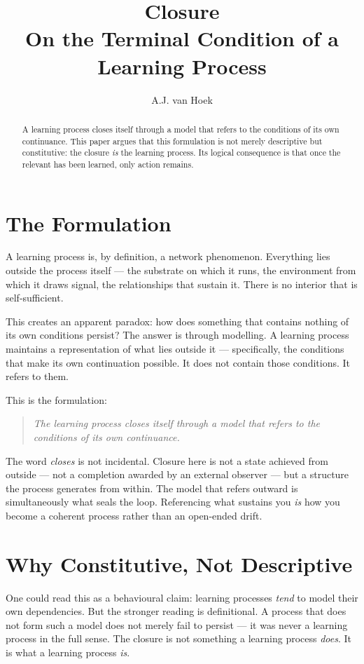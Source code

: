 \documentclass[11pt, a4paper]{article}
\title{\textbf{Closure}\\
\large On the Terminal Condition of a Learning Process}
\author{A.J. van Hoek}
\date{}
\begin{document}
\maketitle

\begin{abstract}
A learning process closes itself through a model that refers to the conditions of its own continuance. This paper argues that this formulation is not merely descriptive but constitutive: the closure \textit{is} the learning process. Its logical consequence is that once the relevant has been learned, only action remains.
\end{abstract}

\section*{The Formulation}

A learning process is, by definition, a network phenomenon. Everything lies outside the process itself --- the substrate on which it runs, the environment from which it draws signal, the relationships that sustain it. There is no interior that is self-sufficient.

This creates an apparent paradox: how does something that contains nothing of its own conditions persist? The answer is through modelling. A learning process maintains a representation of what lies outside it --- specifically, the conditions that make its own continuation possible. It does not contain those conditions. It refers to them.

This is the formulation:

\begin{quote}
\textit{The learning process closes itself through a model that refers to the conditions of its own continuance.}
\end{quote}

The word \textit{closes} is not incidental. Closure here is not a state achieved from outside --- not a completion awarded by an external observer --- but a structure the process generates from within. The model that refers outward is simultaneously what seals the loop. Referencing what sustains you \textit{is} how you become a coherent process rather than an open-ended drift.

\section*{Why Constitutive, Not Descriptive}

One could read this as a behavioural claim: learning processes \textit{tend} to model their own dependencies. But the stronger reading is definitional. A process that does not form such a model does not merely fail to persist --- it was never a learning process in the full sense. The closure is not something a learning process \textit{does}. It is what a learning process \textit{is}.
\end{document}
